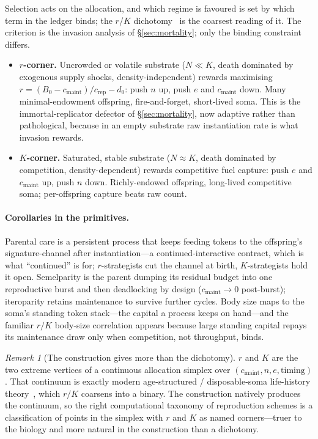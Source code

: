 \documentclass[11pt]{article}
\theoremstyle{plain}
\theoremstyle{definition}
\theoremstyle{remark}
\newtheorem*{remark}{Remark}
\newcommand{\cmaint}{c_{\mathrm{maint}}}
\newcommand{\crep}{c_{\mathrm{rep}}}
\begin{document}
Selection acts on the allocation, and which regime is favoured is set by which
term in the ledger binds; the $r$/$K$
dichotomy~\cite{macarthur1967,pianka1970} is the coarsest reading of it. The
criterion is the invasion analysis of
\S\ref{sec:mortality}; only the binding constraint differs.

\begin{itemize}[leftmargin=1.4em,itemsep=0.3em]
\item \textbf{$r$-corner.} Uncrowded or volatile substrate ($N\ll K$, death
dominated by exogenous supply shocks, density-independent) rewards maximising
$r=(B_0-\cmaint)/\crep-d_0$: push $n$ up, push $e$ and $\cmaint$ down. Many
minimal-endowment offspring, fire-and-forget, short-lived soma. This is the
immortal-replicator defector of \S\ref{sec:mortality}, now adaptive rather than
pathological, because in an empty substrate raw instantiation rate is what
invasion rewards.

\item \textbf{$K$-corner.} Saturated, stable substrate ($N\approx K$, death
dominated by competition, density-dependent) rewards competitive fuel capture:
push $e$ and $\cmaint$ up, push $n$ down. Richly-endowed offspring,
long-lived competitive soma; per-offspring capture beats raw count.
\end{itemize}

\paragraph{Corollaries in the primitives.}
Parental care is a persistent process that keeps feeding tokens to the
offspring's signature-channel after instantiation---a continued-interactive
contract, which is what ``continued'' is for; $r$-strategists cut the channel at
birth, $K$-strategists hold it open. Semelparity is the parent dumping its
residual budget into one reproductive burst and then deadlocking by design
($\cmaint\to 0$ post-burst); iteroparity retains maintenance to survive further
cycles. Body size maps to the soma's standing token stack---the capital a
process keeps on hand---and the familiar $r/K$ body-size correlation appears
because large standing capital repays its maintenance draw only when competition,
not throughput, binds.

\begin{remark}[The construction gives more than the dichotomy]
$r$ and $K$ are the two extreme vertices of a continuous allocation simplex over
$(\cmaint, n, e, \text{timing})$. That continuum is exactly modern
age-structured / disposable-soma life-history
theory~\cite{stearns1992,kirkwood1977}, which
$r/K$ coarsens into a binary. The construction natively produces the continuum,
so the right computational taxonomy of reproduction schemes is a classification
of points in the simplex with $r$ and $K$ as named corners---truer to the
biology and more natural in the construction than a dichotomy.
\end{remark}
\end{document}
